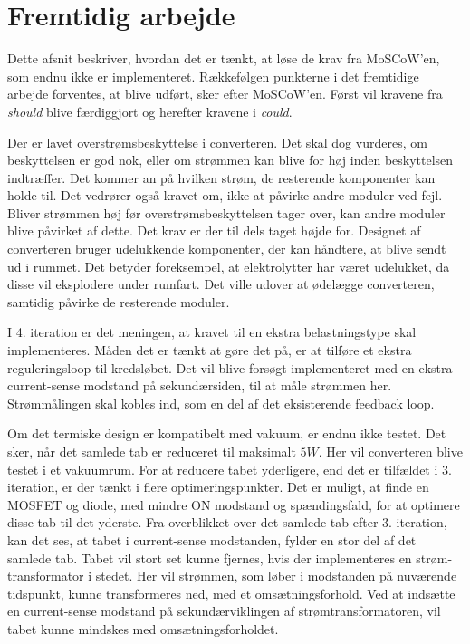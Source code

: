 \chapter{Fremtidig arbejde} \label{future}
Dette afsnit beskriver, hvordan det er tænkt, at løse de krav fra MoSCoW'en, som endnu ikke er implementeret. Rækkefølgen punkterne i det fremtidige arbejde forventes, at blive udført, sker efter MoSCoW'en. Først vil kravene fra \textit{should} blive færdiggjort og herefter kravene i \textit{could}.  

Der er lavet overstrømsbeskyttelse i converteren. Det skal dog vurderes, om beskyttelsen er god nok, eller om strømmen kan blive for høj inden beskyttelsen indtræffer. Det kommer an på hvilken strøm, de resterende komponenter kan holde til. Det vedrører også kravet om, ikke at påvirke andre moduler ved fejl. Bliver strømmen høj før overstrømsbeskyttelsen tager over, kan andre moduler blive påvirket af dette. Det krav er der til dels taget højde for. Designet af converteren bruger udelukkende komponenter, der kan håndtere, at blive sendt ud i rummet. Det betyder foreksempel, at elektrolytter har været udelukket, da disse vil eksplodere under rumfart. Det ville udover at ødelægge converteren, samtidig påvirke de resterende moduler.

I 4. iteration er det meningen, at kravet til en ekstra belastningstype skal implementeres. Måden det er tænkt at gøre det på, er at tilføre et ekstra reguleringsloop til kredsløbet. Det vil blive forsøgt implementeret med en ekstra current-sense modstand på sekundærsiden, til at måle strømmen her. Strømmålingen skal kobles ind, som en del af det eksisterende feedback loop.

Om det termiske design er kompatibelt med vakuum, er endnu ikke testet. Det sker, når det samlede tab er reduceret til maksimalt $5W$. Her vil converteren blive testet i et vakuumrum. For at reducere tabet yderligere, end det er tilfældet i 3. iteration, er der tænkt i flere optimeringspunkter. Det er muligt, at finde en MOSFET og diode, med mindre ON modstand og spændingsfald, for at optimere disse tab til det yderste. 
Fra overblikket over det samlede tab efter 3. iteration, kan det ses, at tabet i current-sense modstanden, fylder en stor del af det samlede tab. Tabet vil stort set kunne fjernes, hvis der implementeres en strøm-transformator i stedet. Her vil strømmen, som løber i modstanden på nuværende tidspunkt, kunne transformeres ned, med et omsætningsforhold. Ved at indsætte en current-sense modstand på sekundærviklingen af strømtransformatoren, vil tabet kunne mindskes med omsætningsforholdet.  

